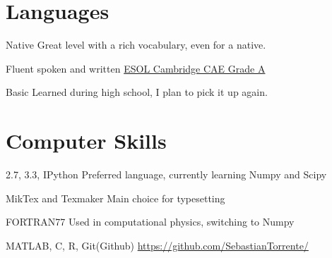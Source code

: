 \documentclass[11pt,a4paper,roman]{moderncv}
\begin{document}




\section{Languages}
	{Native}
	{Great level with a rich vocabulary, even for a native.}

	{Fluent spoken and written}
	{\href{https://dl.dropbox.com/u/87894135/StatementOfResult.pdf}
	{ESOL Cambridge CAE Grade A}}

	{Basic}
	{Learned during high school, I plan to pick it up again.}


\section{Computer Skills}

	{2.7, 3.3, IPython}
	{Preferred language, currently learning Numpy and Scipy}

\cvitemwithcomment{\LaTeX}
	{MikTex and Texmaker}
	{Main choice for typesetting}

	{FORTRAN77}
	{Used in computational physics, switching to Numpy}


	{MATLAB, C, R, Git(Github)}
	{\href{https://github.com/SebastianTorrente/}
	{https://github.com/SebastianTorrente/}}
\end{document}
